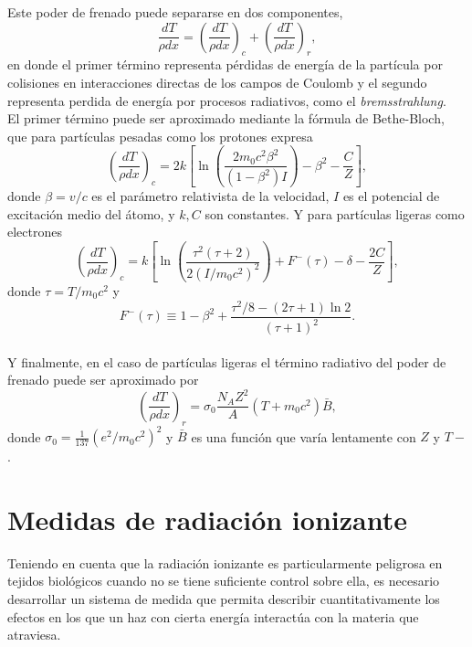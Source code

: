 Este poder de frenado puede separarse en dos componentes, 
\begin{equation}
	\frac{dT}{\rho dx}=\left(\frac{dT}{\rho dx}\right)_c+\left(\frac{dT}{\rho dx}\right)_r,
\end{equation}   
en donde el primer término representa pérdidas de energía de la partícula por colisiones en interacciones directas de los campos de Coulomb y el segundo representa perdida de energía por procesos radiativos, como el \textit{bremsstrahlung}.\\

El primer término puede ser aproximado mediante la fórmula de Bethe-Bloch, que para partículas pesadas como los protones expresa\cite{Attix1986}
\begin{equation}
	\left(\frac{d T}{\rho d x}\right)_{c}=2 k\left[\ln \left(\frac{2 m_{0} c^{2} \beta^{2}}{\left(1-\beta^{2}\right) I}\right)-\beta^{2} -\frac{C}{Z}\right],
\end{equation}
donde $\beta=v/c$ es el parámetro relativista de la velocidad, $I$ es el potencial de excitación medio del átomo, y $k,C$ son constantes. Y para partículas ligeras como electrones
\begin{equation}\left(\frac{d T}{\rho d x}\right)_{c}=k\left[\ln \left(\frac{\tau^{2}(\tau+2)}{2\left(I / m_{0} c^{2}\right)^{2}}\right)+F^{-}(\tau)-\delta-\frac{2 C}{Z}\right],\end{equation}
donde $\tau=T/m_0c^2$ y 
\begin{equation}F^{-}(\tau) \equiv 1-\beta^{2}+\frac{\tau^{2} / 8-(2 \tau+1) \ln 2}{(\tau+1)^{2}}.\end{equation}\\

Y finalmente, en el caso de partículas ligeras el término radiativo del poder de frenado puede ser aproximado por \cite{Attix1986}
\begin{equation}\left(\frac{d T}{\rho d x}\right)_{r}=\sigma_{0} \frac{N_{A} Z^{2}}{A}\left(T+m_{0} c^{2}\right) \bar{B},\end{equation}
donde $\sigma_0=\frac{1}{137}(e^2/m_0c^2)^2$ y $\bar{B}$ es una función que varía lentamente con $Z$ y $T-$.

\section{Medidas de radiación ionizante}
Teniendo en cuenta que la radiación ionizante es particularmente peligrosa en tejidos biológicos cuando no se tiene suficiente control sobre ella, es necesario desarrollar un sistema de medida que permita describir cuantitativamente los efectos en los que un haz con cierta energía interactúa con la materia que atraviesa.\\

